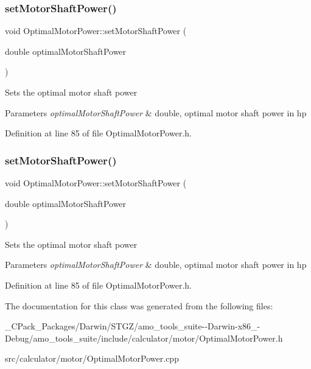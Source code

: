 \subsubsection{\texorpdfstring{set\+Motor\+Shaft\+Power()}{setMotorShaftPower()}\hspace{0.1cm}{\footnotesize\ttfamily [2/3]}}
{\footnotesize\ttfamily void Optimal\+Motor\+Power\+::set\+Motor\+Shaft\+Power (\begin{DoxyParamCaption}\item[{double}]{optimal\+Motor\+Shaft\+Power }\end{DoxyParamCaption})\hspace{0.3cm}{\ttfamily [inline]}}

Sets the optimal motor shaft power 
\begin{DoxyParams}{Parameters}
{\em optimal\+Motor\+Shaft\+Power} & double, optimal motor shaft power in hp \\
\hline
\end{DoxyParams}


Definition at line 85 of file Optimal\+Motor\+Power.\+h.

\mbox{\label{class_optimal_motor_power_ada8a9e3caac34c54470ad13ffe7edf53}} 
\subsubsection{\texorpdfstring{set\+Motor\+Shaft\+Power()}{setMotorShaftPower()}\hspace{0.1cm}{\footnotesize\ttfamily [3/3]}}
{\footnotesize\ttfamily void Optimal\+Motor\+Power\+::set\+Motor\+Shaft\+Power (\begin{DoxyParamCaption}\item[{double}]{optimal\+Motor\+Shaft\+Power }\end{DoxyParamCaption})\hspace{0.3cm}{\ttfamily [inline]}}

Sets the optimal motor shaft power 
\begin{DoxyParams}{Parameters}
{\em optimal\+Motor\+Shaft\+Power} & double, optimal motor shaft power in hp \\
\hline
\end{DoxyParams}


Definition at line 85 of file Optimal\+Motor\+Power.\+h.



The documentation for this class was generated from the following files\+:\begin{DoxyCompactItemize}
\item 
\+\_\+\+C\+Pack\+\_\+\+Packages/\+Darwin/\+S\+T\+G\+Z/amo\+\_\+tools\+\_\+suite-\/-\/\+Darwin-\/x86\+\_-\/\+Debug/amo\+\_\+tools\+\_\+suite/include/calculator/motor/Optimal\+Motor\+Power.\+h\item 
src/calculator/motor/Optimal\+Motor\+Power.\+cpp\end{DoxyCompactItemize}
